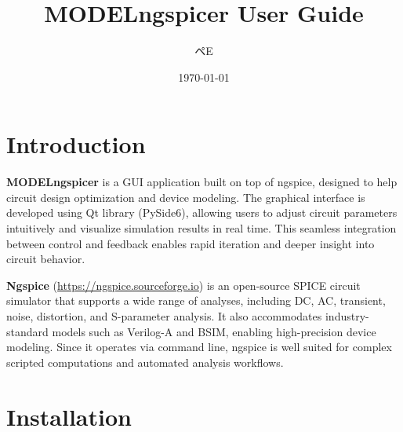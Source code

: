 \documentclass[a4paper,12pt,titlepage]{article}
\begin{document}

\title{MODELngspicer User Guide}
\author{ペE}
\date{\today}
\maketitle

\tableofcontents
\newpage

\section{Introduction}

\textbf{MODELngspicer} is a GUI application built on top of ngspice, designed to help circuit
design optimization and device modeling. The graphical interface is developed using Qt library
(PySide6), allowing users to adjust circuit parameters intuitively and visualize simulation results
in real time. This seamless integration between control and feedback enables rapid iteration and
deeper insight into circuit behavior.

\textbf{Ngspice} (\url{https://ngspice.sourceforge.io}) is an open-source SPICE circuit simulator
that supports a wide range of analyses, including DC, AC, transient, noise, distortion, and
S-parameter analysis. It also accommodates industry-standard models such as Verilog-A and BSIM,
enabling high-precision device modeling. Since it operates via command line, ngspice is well suited
for complex scripted computations and automated analysis workflows.

\section{Installation}

\end{document}
